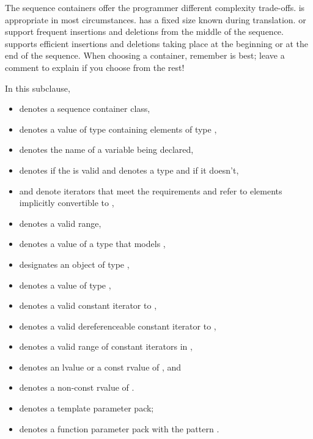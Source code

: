 \pnum
\begin{note}
The sequence containers
offer the programmer different complexity trade-offs.
is appropriate in most circumstances.
has a fixed size known during translation.
 or 
support frequent insertions and deletions from the
middle of the sequence.
supports efficient insertions and deletions taking place at the beginning or at the
end of the sequence.
When choosing a container, remember  is best;
leave a comment to explain if you choose from the rest!
\end{note}

\pnum
In this subclause,
\begin{itemize}
\item
{} denotes a sequence container class,
\item
{} denotes a value of type  containing elements of type ,
\item
{} denotes the name of a variable being declared,
\item
{} denotes  if
the   is valid and denotes a
type and
 if it doesn't,
\item
{} and 
denote iterators that meet the  requirements
and refer to elements implicitly convertible to ,
\item
\tcode{[i, j)} denotes a valid range,
\item
{} denotes a value of a type 
that models ,
\item
{} designates an object of type ,
\item
{} denotes a value of type ,
\item
{} denotes a valid constant iterator to ,
\item
{} denotes a valid dereferenceable constant iterator to ,
\item
\tcode{[q1, q2)} denotes a valid range of constant iterators in ,
\item
{} denotes an lvalue or a const rvalue of , and
\item
{} denotes a non-const rvalue of .
\item
{} denotes a template parameter pack;
\item
{} denotes a function parameter pack with the pattern .
\end{itemize}

